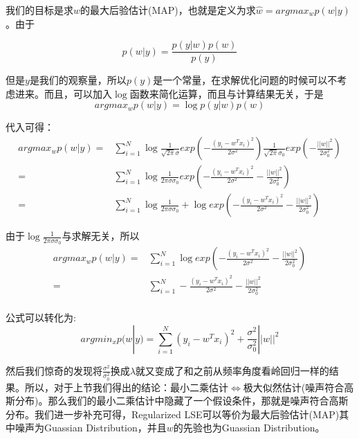 \documentclass[a4paper]{article}
\begin{document}
我们的目标是求$w$的最大后验估计(MAP)，也就是定义为求$\hat{w} = argmax_w p(w|y)$。由于

\begin{equation}
    p(w|y) = \frac{p(y|w)p(w)}{p(y)}
\end{equation}

但是$y$是我们的观察量，所以$p(y)$是一个常量，在求解优化问题的时候可以不考虑进来。而且，可以加入$\log$函数来简化运算，而且与计算结果无关，于是
\begin{equation}
    argmax_w p(w|y)= \log p(y|w)p(w)
\end{equation}

代入可得：
\begin{align}
    argmax_w p(w|y) = & \sum_{i=1}^{N}\log \frac{1}{\sqrt{2\pi}\sigma}exp\left( -\frac{(y_i - w^Tx_i)^2}{2\sigma^2}  \right) \frac{1}{\sqrt{2\pi}\sigma_0}exp\left( -\frac{||w||^2}{2\sigma_0^2} \right) \\
    = & \sum_{i=1}^{N}\log \frac{1}{2\pi\sigma\sigma_0}exp\left( -\frac{(y_i - w^Tx_i)^2}{2\sigma^2}  -\frac{||w||^2}{2\sigma_0^2} \right) \\
    = & \sum_{i=1}^{N} \log \frac{1}{2\pi\sigma\sigma_0} + \log exp\left( -\frac{(y_i - w^Tx_i)^2}{2\sigma^2}  -\frac{||w||^2}{2\sigma_0^2} \right) 
\end{align}

由于$\log \frac{1}{2\pi\sigma\sigma_0}$与求解无关，所以
\begin{align}
    argmax_w p(w|y) 
    = & \sum_{i=1}^{N}  \log exp\left( -\frac{(y_i - w^Tx_i)^2}{2\sigma^2}  -\frac{||w||^2}{2\sigma_0^2} \right) \\
    = & \sum_{i=1}^{N}  -\frac{(y_i - w^Tx_i)^2}{2\sigma^2}  -\frac{||w||^2}{2\sigma_0^2} \\
\end{align}

公式可以转化为:
\begin{equation}
    argmin_x p(w|y) =  \sum_{i=1}^{N} (y_i - w^Tx_i)^2  + \frac{\sigma^2}{\sigma_0^2}||w||^2
\end{equation}

然后我们惊奇的发现将$\frac{\sigma^2}{\sigma_0^2}$换成$\lambda$就又变成了和之前从频率角度看岭回归一样的结果。所以，对于上节我们得出的结论：最小二乘估计$\Longleftrightarrow$极大似然估计(噪声符合高斯分布)。那么我们的最小二乘估计中隐藏了一个假设条件，那就是噪声符合高斯分布。我们进一步补充可得，Regularized LSE可以等价为最大后验估计(MAP)其中噪声为Guassian Distribution，并且$w$的先验也为Guassian Distribution。
\end{document}
